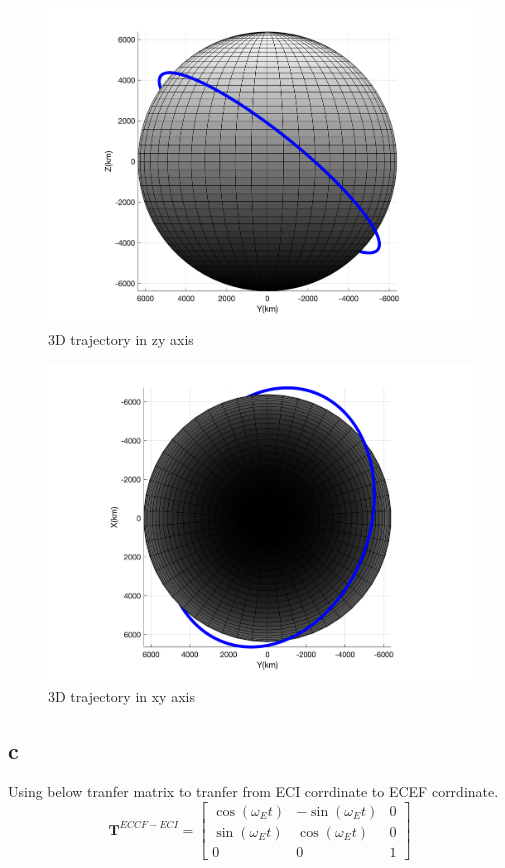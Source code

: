     \begin{figure}[H]
        \caption{3D trajectory in zy axis}
        \centering
        \includegraphics[width=16cm]{../Figure/Short_project/yz_view}
    \end{figure}

    \begin{figure}[H]
        \caption{3D trajectory in xy axis}
        \centering
        \includegraphics[width=16cm]{../Figure/Short_project/xy_view}
    \end{figure}

    \subsection{c}
    Using below tranfer matrix to tranfer from ECI corrdinate to ECEF corrdinate.
    $$
    \boldsymbol T^{ECCF-ECI} = \begin{bmatrix}
        \cos(\omega_Et) & -\sin(\omega_Et)& 0\\
        \sin(\omega_Et) &  \cos(\omega_Et)& 0\\
                0       &      0          & 1
    \end{bmatrix}
    $$

